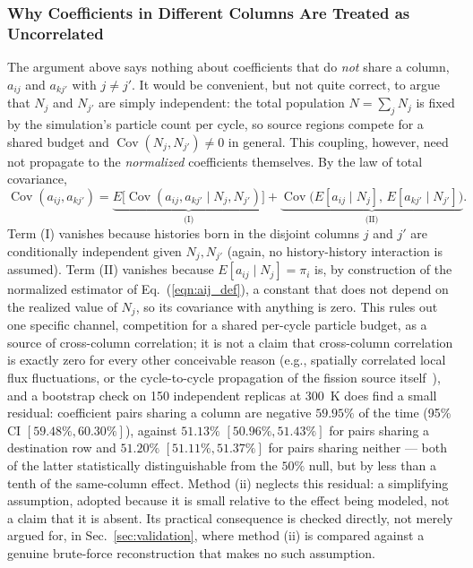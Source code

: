\documentclass{style/nseJournal}
\begin{document}
\subsubsection{Why Coefficients in Different Columns Are Treated as Uncorrelated}
\label{sec:cross_column}

The argument above says nothing about coefficients that do \emph{not} share a column, $a_{ij}$ and $a_{kj'}$ with $j\neq j'$. It would be convenient, but not quite correct, to argue that $N_j$ and $N_{j'}$ are simply independent: the total population $N=\sum_j N_j$ is fixed by the simulation's particle count per cycle, so source regions compete for a shared budget and $\operatorname{Cov}(N_j,N_{j'})\neq0$ in general. This coupling, however, need not propagate to the \emph{normalized} coefficients themselves. By the law of total covariance,
\begin{equation}
  \operatorname{Cov}(a_{ij},a_{kj'}) = \underbrace{E\big[\operatorname{Cov}(a_{ij},a_{kj'}\mid N_j,N_{j'})\big]}_{\text{(I)}}
  + \underbrace{\operatorname{Cov}\big(E[a_{ij}\mid N_j],\, E[a_{kj'}\mid N_{j'}]\big)}_{\text{(II)}} .
  \label{eqn:total_cov_law}
\end{equation}
Term (I) vanishes because histories born in the disjoint columns $j$ and $j'$ are conditionally independent given $N_j,N_{j'}$ (again, no history-history interaction is assumed). Term (II) vanishes because $E[a_{ij}\mid N_j]=\pi_i$ is, by construction of the normalized estimator of Eq.~(\ref{eqn:aij_def}), a constant that does not depend on the realized value of $N_j$, so its covariance with anything is zero. This rules out one specific channel, competition for a shared per-cycle particle budget, as a source of cross-column correlation; it is not a claim that cross-column correlation is exactly zero for every other conceivable reason (e.g., spatially correlated local flux fluctuations, or the cycle-to-cycle propagation of the fission source itself~\cite{UekiNSE2003}), and a bootstrap check on 150 independent replicas at 300~K does find a small residual: coefficient pairs sharing a column are negative $59.95\%$ of the time (95\% CI $[59.48\%,60.30\%]$), against $51.13\%$ $[50.96\%,51.43\%]$ for pairs sharing a destination row and $51.20\%$ $[51.11\%,51.37\%]$ for pairs sharing neither --- both of the latter statistically distinguishable from the $50\%$ null, but by less than a tenth of the same-column effect. Method (ii) neglects this residual: a simplifying assumption, adopted because it is small relative to the effect being modeled, not a claim that it is absent. Its practical consequence is checked directly, not merely argued for, in Sec.~\ref{sec:validation}, where method (ii) is compared against a genuine brute-force reconstruction that makes no such assumption.
\end{document}
